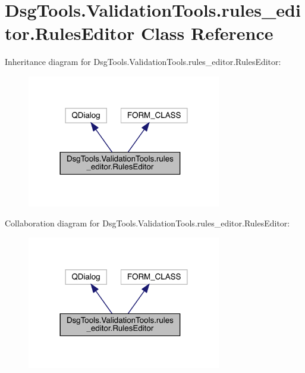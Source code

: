 \hypertarget{class_dsg_tools_1_1_validation_tools_1_1rules__editor_1_1_rules_editor}{}\section{Dsg\+Tools.\+Validation\+Tools.\+rules\+\_\+editor.\+Rules\+Editor Class Reference}
\label{class_dsg_tools_1_1_validation_tools_1_1rules__editor_1_1_rules_editor}


Inheritance diagram for Dsg\+Tools.\+Validation\+Tools.\+rules\+\_\+editor.\+Rules\+Editor\+:
\nopagebreak
\begin{figure}[H]
\begin{center}
\leavevmode
\includegraphics[width=240pt]{class_dsg_tools_1_1_validation_tools_1_1rules__editor_1_1_rules_editor__inherit__graph}
\end{center}
\end{figure}


Collaboration diagram for Dsg\+Tools.\+Validation\+Tools.\+rules\+\_\+editor.\+Rules\+Editor\+:
\nopagebreak
\begin{figure}[H]
\begin{center}
\leavevmode
\includegraphics[width=240pt]{class_dsg_tools_1_1_validation_tools_1_1rules__editor_1_1_rules_editor__coll__graph}
\end{center}
\end{figure}

